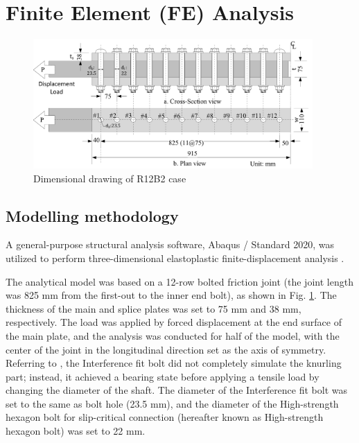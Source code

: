 \section{Finite Element (FE) Analysis}

\begin{figure}[htbp]
    \centering
    \includegraphics[width=0.95\textwidth]{imgs/ch5/femodelsize.pdf}
    \caption{Dimensional drawing of R12B2 case}
    \label{fig-modelsize}
\end{figure}

\subsection{Modelling methodology}

A general-purpose structural analysis software, Abaqus / Standard 2020, was utilized to perform three-dimensional elastoplastic finite-displacement analysis \cite{Smith2020}. \par
The analytical model was based on a 12-row bolted friction joint (the joint length was 825 mm from the first-out to the inner end bolt), as shown in Fig. \ref{fig-modelsize}. The thickness of the main and splice plates was set to 75 mm and 38 mm, respectively. The load was applied by forced displacement at the end surface of the main plate, and the analysis was conducted for half of the model, with the center of the joint in the longitudinal direction set as the axis of symmetry. Referring to \cite{Shimozato2008ExperrimentalModel}, the Interference fit bolt did not completely simulate the knurling part; instead, it achieved a bearing state before applying a tensile load by changing the diameter of the shaft. The diameter of the Interference fit bolt was set to the same as bolt hole (23.5 mm), and the diameter of the High-strength hexagon bolt for slip-critical connection (hereafter known as High-strength hexagon bolt) was set to 22 mm. \par

